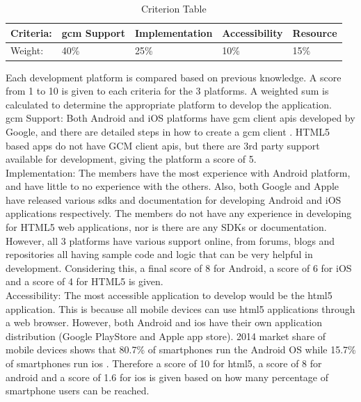\documentclass{article}
\begin{document}
\begin{table}[H]
\centering
\caption{Criterion Table}
\label{tab:criterion-table}
\begin{tabular}{lllll}
\toprule
\textbf{Criteria:} & \textbf{\gls{gcm} Support} & \textbf{Implementation}  & \textbf{Accessibility} & \textbf{Resource}\\ 
\midrule
Weight:   & 40\%        & 25\%           & 10\%          & 15\%  \\
\bottomrule  
\end{tabular}
\end{table}


Each development platform is compared based on previous knowledge. A score from 1 to 10 is given to each criteria for the 3 platforms. A weighted sum is calculated to determine the appropriate platform to develop the application. \\

\noindent \gls{gcm} Support: Both Android and iOS platforms have \gls{gcm} client \glspl{api} developed by Google, and there are detailed steps in how to create a \gls{gcm} client \cite{gcm}. HTML5 based apps do not have GCM client \glspl{api}, but there are 3rd party support available for development, giving the platform a score of 5. \\

\noindent Implementation: The members have the most experience with Android platform, and have little to no experience with the others. Also, both Google and Apple have released various \gls{sdk}s and documentation for developing Android and iOS applications respectively. The members do not have any experience in developing for HTML5 web applications, nor is there are any SDKs or documentation. However, all 3 platforms have various support online, from forums, blogs and repositories all having sample code and logic that can be very helpful in development. Considering this, a final score of 8 for Android, a score of 6 for iOS and a score of 4 for HTML5 is given. \\

\noindent Accessibility: The most accessible application to develop would be the \gls{html5} application. This is because all mobile devices can use \gls{html5} applications through a web browser. However, both Android and \gls{ios} have their own application distribution (Google PlayStore and Apple app store). 2014 market share of mobile devices shows that 80.7\% of smartphones run the Android OS while 15.7\% of smartphones run \gls{ios} \cite{market}. Therefore a score of 10 for \gls{html5}, a score of 8 for android and a score of 1.6 for \gls{ios} is given based on how many percentage of smartphone users can be reached. \\
\end{document}
